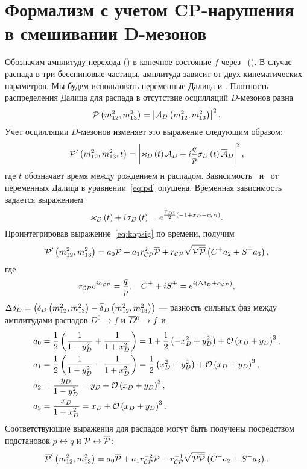 \chapter{Формализм с учетом CP-нарушения в смешивании D-мезонов} \label{app:full_formalism}
Обозначим амплитуду перехода \dn (\dnbar) в конечное состояние $f$ через \ad\ (\adbar).  В случае распада в три бесспиновые частицы, амплитуда \dn зависит от двух кинематических параметров.  Мы будем использовать переменные Далица \mosq и \mtsq.  Плотность распределения Далица для распада \dn в отсутствие осцилляций $D$-мезонов равна
\begin{equation}
 \mathcal{P}\left(m_{12}^2,m_{13}^2\right) = \left |\mathcal{A}_D\left(m_{12}^2,m_{13}^2\right)\right |^2.
\end{equation}
Учет осцилляции $D$-мезонов изменяет это выражение следующим образом:
\begin{equation}\label{eq:pd}
  \mathcal{P}^{\prime}\left(m_{12}^2,m_{13}^2,t\right) = 
    \left |\varkappa_D\left(t\right)\mathcal{A}_D + i\frac{q}{p}\sigma_D\left(t\right) \overline{\mathcal{A}}_D\right |^2, 
\end{equation}
где $t$ обозначает время между рождением и распадом.  Зависимость \ad\ и \adbar\ от переменных Далица в уравнении~\eqref{eq:pd} опущена.  Временная зависимость задается выражением
\begin{equation}\label{eq:kapsig}
   \varkappa_D\left(t\right) + i\sigma_D\left(t\right) = e^{\frac{\Gamma_Dt}{2}(-1+x_D-iy_D)}. 
\end{equation}
Проинтегрировав выражение~\eqref{eq:kapsig} по времени, получим
\begin{equation}
 \mathcal{P}^{\prime}\left(m_{12}^2,m_{13}^2\right)=a_0\mathcal{P} + a_1r^{2}_{\mathcal{CP}}\overline{\mathcal{P}} +
                r_{\mathcal{CP}}\sqrt{\mathcal{P}\overline{\mathcal{P}}}\left (C^+a_2+S^+a_3\right ),
\end{equation}
где
\begin{equation}
 r_{\mathcal{CP}}e^{i\alpha_{\mathcal{CP}}}=\frac{q}{p},\quad C^{\pm} + iS^{\pm} = e^{i\left(\Delta\delta_D\pm\alpha_{\mathcal{CP}}\right)},
\end{equation}
$\Delta\delta_D=\left(\delta_D\left(m_{12}^2,m_{13}^2\right)-\overline{\delta}_D\left(m_{12}^2,m_{13}^2\right)\right)$ --- разность сильных фаз между амплитудами распадов $D^0\to f$ и $\overline{D}{}^0\to f$ и
\begin{equation}
  \begin{split}
   a_0&=\frac{1}{2}\left (\frac{1}{1-y_D^2}+\frac{1}{1+x_D^2}\right )
      =1+\frac{1}{2}\left (-x_D^2+y_D^2\right )+\mathcal{O}\left( x_D+y_D\right)^3,\\
   a_1&=\frac{1}{2}\left (\frac{1}{1-y_D^2}-\frac{1}{1+x_D^2}\right )
      =\frac{1}{2}\left (x_D^2+y_D^2\right )+\mathcal{O}\left( x_D+y_D\right)^3,\\
   a_2&=\frac{y_D}{1-y_D^2}=y_D+\mathcal{O}\left( x_D+y_D\right)^3,\\
   a_3&=\frac{x_D}{1+x_D^2}=x_D+\mathcal{O}\left( x_D+y_D\right)^3.
  \end{split}
 \end{equation}
Соответствующие выражения для распадов \dnbar могут быть получены посредством подстановок
$p\leftrightarrow q$ и $\mathcal{P} \leftrightarrow \overline{\mathcal{P}}$:
\begin{equation}
 \overline{\mathcal{P}}^{\prime}\left(m_{12}^2,m_{13}^2\right)=a_0\overline{\mathcal{P}} + a_1r^{-2}_{\mathcal{CP}}\mathcal{P} +
                r^{-1}_{\mathcal{CP}}\sqrt{\mathcal{P}\overline{\mathcal{P}}}\left( C^-a_2+S^-a_3\right).
\end{equation}

